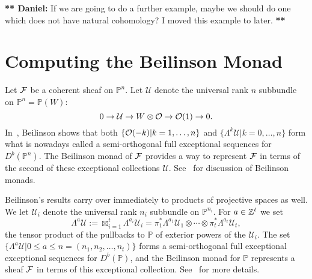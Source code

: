\documentclass[twoside,12pt, leqno]{amsart}
\def\PP{{\mathbb P}}
\def\bU{{\bf U}}
\def\CU{{\mathcal U}}
\def\daniel#1{{\bf *** Daniel:} #1 {\bf ***}}
\begin{document}
\daniel{If we are going to do a further example, maybe we should do one which does not have natural cohomology?  I moved this example to later.}

     
\section{Computing the Beilinson Monad}\label{sec:beilinson monad}
Let ${\mathcal F}$ be a coherent sheaf on $\PP^n$. 
Let $\CU$ denote the universal rank $n$ subbundle on $\PP^n=\PP(W)$:
$$ 0 \to \CU \to W\otimes \sO \to \sO(1) \to 0.$$ 
In~\cite{beilinson}, Beilinson shows that both $\{ {\mathcal O}(-k) | k=1,\ldots,n\}$ and 
$\{ \Lambda^k \CU | k=0, \ldots, n\}$ form what is nowadays called a semi-orthogonal full exceptional  sequences for $D^b(\PP^n)$.
The Beilinson monad of ${\mathcal F}$ provides a way to represent ${\mathcal F}$ in terms of the second of these exceptional collections $\CU$.  See~\cite{beilinson,ancona-ottaviani,EFS,Huybrechts} for discussion of Beilinson monads.



Beilinson's results carry over immediately to products of projective spaces as well.  We let $\CU_i$ denote the universal rank $n_i$ subbundle on $\PP^{n_i}$.  For $a\in {\mathbb Z}^{t}$ we set
$$
\Lambda^a \CU := \boxtimes_{i=1}^t \Lambda^{a_i} \CU_i=\pi_1^*\Lambda^{a_1}\CU_1 \otimes \cdots \otimes \pi_t^*\Lambda^{a_t} \CU_t,
$$
the tensor product of the pullbacks to $\PP$ of exterior powers of the $\CU_i$. The set $\{\Lambda^a \CU | 0 \leq a \leq n=(n_1,n_2,\dots,n_t)\}$ forms a semi-orthogonal full exceptional exceptional sequences for $D^b(\PP)$, and the Beilinson monad for $\PP$ represents a sheaf ${\mathcal F}$ in terms of this exceptional collection.  See~\cite[\S2]{EES} for more details.
\end{document}
